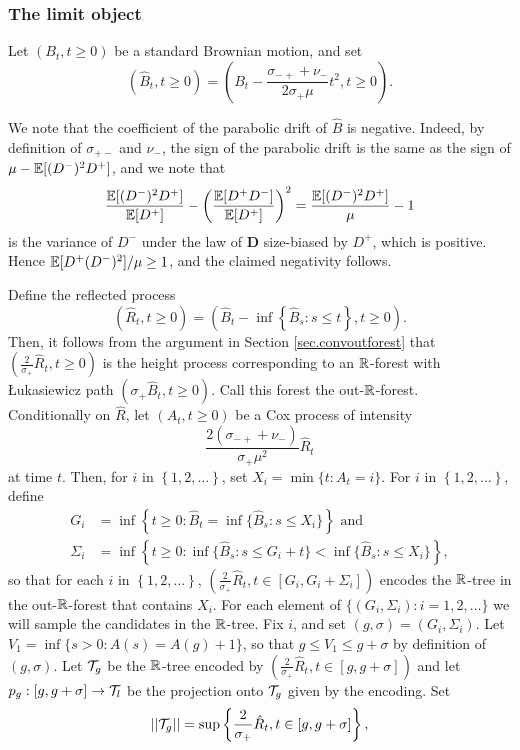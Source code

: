 \subsubsection{The limit object}\label{subsubsec.samplecontinuousobject}
Let $(B_t,t\geq 0)$ be a standard Brownian motion, and set $$\left(\hat{B}_t,t\geq 0\right)=\left(B_t-\frac{\sigma_{-+}+\nu_-}{2\sigma_+\mu}t^2,t\geq 0\right).$$ 
\begin{remark}
We note that the coefficient of the parabolic drift of $\hat{B}$ is negative. Indeed, by definition of $\sigma_{+-}$ and $\nu_-$, the sign of the parabolic drift is the same as the sign of $\mu-{\mathbb E}[(D^-)^2D^+]$, and we note that
$$\frac{{\mathbb E}[(D^-)^2D^+]}{{\mathbb E}[D^+]}-\left(\frac{{\mathbb E}[D^+D^-]}{{\mathbb E}[D^+]}\right)^2=\frac{{\mathbb E}[(D^-)^2D^+]}{\mu}-1$$
is the variance of $D^-$ under the law of $\mathbf{D}$ size-biased by $D^+$, which is positive. Hence ${\mathbb E}[D^+(D^-)^2]/\mu\geq 1$, and the claimed negativity follows. 

\end{remark}
Define the reflected process
$$(\hat{R}_t,t\geq 0)= \left(\hat{B}_t-\inf\left\{\hat{B}_s: s\leq t\right\},t\geq 0\right).$$
Then, it follows from the argument in Section \ref{sec.convoutforest} that $\left(\frac{2}{\sigma_+}\hat{R}_t,t\geq 0\right)$ is the height process corresponding to an ${\mathbb R}$-forest with \L ukasiewicz path $\left(\sigma_+\hat{B}_t,t\geq 0\right)$. Call this forest the out-${\mathbb R}$-forest. \\
Conditionally on $\hat{R}$, let $(A_t,t\geq 0)$ be a Cox process of intensity $$\frac{2(\sigma_{-+}+\nu_-)}{\sigma_+\mu^2} \hat{R}_t$$ at time $t$. Then, for $i$ in $\left\{1,2, \dots \right\}$, set $X_i=\min\{t:A_t=i\}$. For $i$ in $\left\{1,2,\dots \right\}$, define
\begin{align*}
G_i&=\inf\left\{t\geq 0:\hat{B}_t=\inf\{\hat{B}_s:s\leq X_i\}\right\}\text{ and}\\
\Sigma_i&=\inf\left\{ t\geq 0: \inf\{\hat{B}_s:s\leq G_i+t\} < \inf\{\hat{B}_s:s\leq X_i\}\right\},
\end{align*}
so that for each $i$ in $\left\{1,2,\dots \right\}$, $\left(\frac{2}{\sigma_+}\hat{R}_t,t\in [G_i,G_i+\Sigma_i]\right)$ encodes the ${\mathbb R}$-tree in the out-${\mathbb R}$-forest that contains $X_i$. For each element of $\{(G_i,\Sigma_i):i=1,2,\dots\}$ we will sample the candidates in the ${\mathbb R}$-tree. Fix $i$, and set $(g,\sigma)=(G_i,\Sigma_i)$. Let $V_1=\inf\{s>0:A(s)=A(g)+1\}$, so that $g\leq V_1\leq g+\sigma$ by definition of $(g,\sigma)$. Let ${\mathcal T}_g$ be the ${\mathbb R}$-tree encoded by $\left(\frac{2}{\sigma_+}\hat{R}_t,t\in [g,g+\sigma]\right)$ and let $p_g:[g,g+\sigma]\to {\mathcal T}_l$ be the projection onto ${\mathcal T}_g$ given by the encoding. Set $$||{\mathcal T}_g||=\sup\left\{\frac{2}{\sigma_+}\hat{R}_t,t\in [g,g+\sigma]\right\},$$
